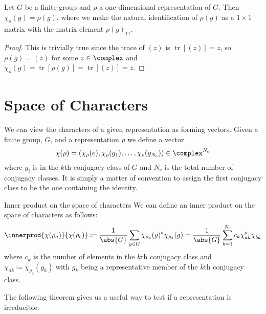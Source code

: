 \documentclass[fleqn]{NotesClass}
\DeclareMathOperator{\tr}{tr}
\begin{document}
    \begin{lma}{}{}
        Let \(G\) be a finite group and \(\rho\) a one-dimensional representation of \(G\).
        Then \(\chi_\rho(g) = \rho(g)\), where we make the natural identification of \(\rho(g)\) as a \(1\times 1\) matrix with the matrix element \(\rho(g)_{11}\).
        \begin{proof}
            This is trivially true since the trace of \((z)\) is \(\tr[(z)] = z\), so \(\rho(g) = (z)\) for some \(z \in \complex\) and \(\chi_\rho(g) = \tr[\rho(g)] = \tr[(z)] = z\).
        \end{proof}
    \end{lma}
    
    \section{Space of Characters}
    We can view the characters of a given representation as forming vectors.
    Given a finite group, \(G\), and a representation \(\rho\) we define a vector
    \begin{equation}
        \chi(\rho) = (\chi_{\rho}(e), \chi_{\rho}(g_1), \dotsc, \chi_{\rho}(g_{N_\mathrm{c}})) \in \complex^{N_{\mathrm{c}}}
    \end{equation}
    where \(g_i\) is in the \(k\)th conjugacy class of \(G\) and \(N_{\mathrm{c}}\) is the total number of conjugacy classes.
    It is simply a matter of convention to assign the first conjugacy class to be the one containing the identity.
    
    \begin{dfn}{Inner product on the space of characters}{}
        We can define an inner product on the space of characters as follows:
        \begin{equation}
            \innerprod{\chi(\rho_a)}{\chi(\rho_b)} \coloneqq \frac{1}{\abs{G}} \sum_{g\in G} \chi_{\rho_a}(g)^{*} \chi_{\rho_b}(g) = \frac{1}{\abs{G}} \sum_{k = 1}^{N_{\mathrm{c}}} c_k \chi^*_{ak}\chi^{\phantom{*}}_{bk}
        \end{equation}
        where \(c_k\) is the number of elements in the \(k\)th conjugacy class and \(\chi_{ak} \coloneqq \chi_{\rho_a}(g_k)\) with \(g_k\) being a representative member of the \(k\)th conjugacy class.
    \end{dfn}
    
    The following theorem gives us a useful way to test if a representation is irreducible.
    
\end{document}
